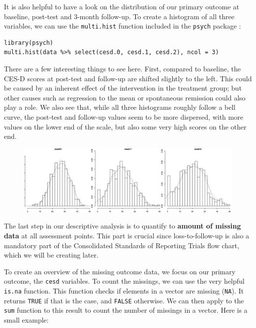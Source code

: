 It is also helpful to have a look on the distribution of our primary outcome at baseline, post-test and 3-month follow-up. To create a histogram of all three variables, we can use the \texttt{multi.hist} function included in the \texttt{psych} package \citep{psych}:

\begin{lstlisting}
library(psych)
multi.hist(data %>% select(cesd.0, cesd.1, cesd.2), ncol = 3)
\end{lstlisting}

There are a few interesting things to see here. First, compared to baseline, the CES-D scores at post-test and follow-up are shifted slightly to the left. This could be caused by an inherent effect of the intervention in the treatment group; but other causes such as regression to the mean or spontaneous remission could also play a role. We also see that, while all three histograms roughly follow a bell curve, the post-test and follow-up values seem to be more dispersed, with more values on the lower end of the scale, but also some very high scores on the other end.

\begin{figure}[H]
\includegraphics[width=13cm]{images/hist.png}
\centering
\end{figure}

The last step in our descriptive analysis is to quantify to \textbf{amount of missing data} at all assessment points. This part is crucial since loss-to-follow-up is also a mandatory part of the Consolidated Standards of Reporting Trials \citep[CONSORT; ][]{moher2012consort} flow chart, which we will be creating later. 

To create an overview of the missing outcome data, we focus on our primary outcome, the \texttt{cesd} variables. To count the missings, we can use the very helpful \texttt{is.na} function. This function checks if elements in a vector are missing (\texttt{NA}). It returns \texttt{TRUE} if that is the case, and \texttt{FALSE} otherwise. We can then apply to the \texttt{sum} function to this result to count the number of missings in a vector. Here is a small example:


